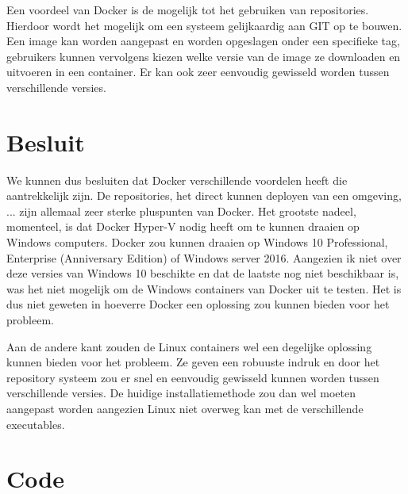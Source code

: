 \documentclass{article}
\begin{document}
Een voordeel van Docker is de mogelijk tot het gebruiken van repositories.
Hierdoor wordt het mogelijk om een systeem gelijkaardig aan GIT op te bouwen.
Een image kan worden aangepast en worden opgeslagen onder een specifieke tag, gebruikers kunnen vervolgens kiezen welke versie van de image ze downloaden en uitvoeren in een container.
Er kan ook zeer eenvoudig gewisseld worden tussen verschillende versies.

\section{Besluit}
We kunnen dus besluiten dat Docker verschillende voordelen heeft die aantrekkelijk zijn.
De repositories, het direct kunnen deployen van een omgeving, ... zijn allemaal zeer sterke pluspunten van Docker.
Het grootste nadeel, momenteel, is dat Docker Hyper-V nodig heeft om te kunnen draaien op Windows computers.
Docker zou kunnen draaien op Windows 10 Professional, Enterprise (Anniversary Edition) of Windows server 2016.
Aangezien ik niet over deze versies van Windows 10 beschikte en dat de laatste nog niet beschikbaar is, was het niet mogelijk om de Windows containers van Docker uit te testen.
Het is dus niet geweten in hoeverre Docker een oplossing zou kunnen bieden voor het probleem.

Aan de andere kant zouden de Linux containers wel een degelijke oplossing kunnen bieden voor het probleem.
Ze geven een robuuste indruk en door het repository systeem zou er snel en eenvoudig gewisseld kunnen worden tussen verschillende versies.
De huidige installatiemethode zou dan wel moeten aangepast worden aangezien Linux niet overweg kan met de verschillende executables.

\section{Code}


%


\end{document}

